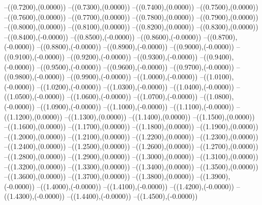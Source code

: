 {	--({\sx*(0.7200)},{\sy*(0.0000)})
	--({\sx*(0.7300)},{\sy*(0.0000)})
	--({\sx*(0.7400)},{\sy*(0.0000)})
	--({\sx*(0.7500)},{\sy*(0.0000)})
	--({\sx*(0.7600)},{\sy*(0.0000)})
	--({\sx*(0.7700)},{\sy*(0.0000)})
	--({\sx*(0.7800)},{\sy*(0.0000)})
	--({\sx*(0.7900)},{\sy*(0.0000)})
	--({\sx*(0.8000)},{\sy*(0.0000)})
	--({\sx*(0.8100)},{\sy*(0.0000)})
	--({\sx*(0.8200)},{\sy*(0.0000)})
	--({\sx*(0.8300)},{\sy*(0.0000)})
	--({\sx*(0.8400)},{\sy*(-0.0000)})
	--({\sx*(0.8500)},{\sy*(-0.0000)})
	--({\sx*(0.8600)},{\sy*(-0.0000)})
	--({\sx*(0.8700)},{\sy*(-0.0000)})
	--({\sx*(0.8800)},{\sy*(-0.0000)})
	--({\sx*(0.8900)},{\sy*(-0.0000)})
	--({\sx*(0.9000)},{\sy*(-0.0000)})
	--({\sx*(0.9100)},{\sy*(-0.0000)})
	--({\sx*(0.9200)},{\sy*(-0.0000)})
	--({\sx*(0.9300)},{\sy*(-0.0000)})
	--({\sx*(0.9400)},{\sy*(-0.0000)})
	--({\sx*(0.9500)},{\sy*(-0.0000)})
	--({\sx*(0.9600)},{\sy*(-0.0000)})
	--({\sx*(0.9700)},{\sy*(-0.0000)})
	--({\sx*(0.9800)},{\sy*(-0.0000)})
	--({\sx*(0.9900)},{\sy*(-0.0000)})
	--({\sx*(1.0000)},{\sy*(-0.0000)})
	--({\sx*(1.0100)},{\sy*(-0.0000)})
	--({\sx*(1.0200)},{\sy*(-0.0000)})
	--({\sx*(1.0300)},{\sy*(-0.0000)})
	--({\sx*(1.0400)},{\sy*(-0.0000)})
	--({\sx*(1.0500)},{\sy*(-0.0000)})
	--({\sx*(1.0600)},{\sy*(-0.0000)})
	--({\sx*(1.0700)},{\sy*(-0.0000)})
	--({\sx*(1.0800)},{\sy*(-0.0000)})
	--({\sx*(1.0900)},{\sy*(-0.0000)})
	--({\sx*(1.1000)},{\sy*(-0.0000)})
	--({\sx*(1.1100)},{\sy*(-0.0000)})
	--({\sx*(1.1200)},{\sy*(0.0000)})
	--({\sx*(1.1300)},{\sy*(0.0000)})
	--({\sx*(1.1400)},{\sy*(0.0000)})
	--({\sx*(1.1500)},{\sy*(0.0000)})
	--({\sx*(1.1600)},{\sy*(0.0000)})
	--({\sx*(1.1700)},{\sy*(0.0000)})
	--({\sx*(1.1800)},{\sy*(0.0000)})
	--({\sx*(1.1900)},{\sy*(0.0000)})
	--({\sx*(1.2000)},{\sy*(0.0000)})
	--({\sx*(1.2100)},{\sy*(0.0000)})
	--({\sx*(1.2200)},{\sy*(0.0000)})
	--({\sx*(1.2300)},{\sy*(0.0000)})
	--({\sx*(1.2400)},{\sy*(0.0000)})
	--({\sx*(1.2500)},{\sy*(0.0000)})
	--({\sx*(1.2600)},{\sy*(0.0000)})
	--({\sx*(1.2700)},{\sy*(0.0000)})
	--({\sx*(1.2800)},{\sy*(0.0000)})
	--({\sx*(1.2900)},{\sy*(0.0000)})
	--({\sx*(1.3000)},{\sy*(0.0000)})
	--({\sx*(1.3100)},{\sy*(0.0000)})
	--({\sx*(1.3200)},{\sy*(0.0000)})
	--({\sx*(1.3300)},{\sy*(0.0000)})
	--({\sx*(1.3400)},{\sy*(0.0000)})
	--({\sx*(1.3500)},{\sy*(0.0000)})
	--({\sx*(1.3600)},{\sy*(0.0000)})
	--({\sx*(1.3700)},{\sy*(0.0000)})
	--({\sx*(1.3800)},{\sy*(0.0000)})
	--({\sx*(1.3900)},{\sy*(-0.0000)})
	--({\sx*(1.4000)},{\sy*(-0.0000)})
	--({\sx*(1.4100)},{\sy*(-0.0000)})
	--({\sx*(1.4200)},{\sy*(-0.0000)})
	--({\sx*(1.4300)},{\sy*(-0.0000)})
	--({\sx*(1.4400)},{\sy*(-0.0000)})
	--({\sx*(1.4500)},{\sy*(-0.0000)})
}
